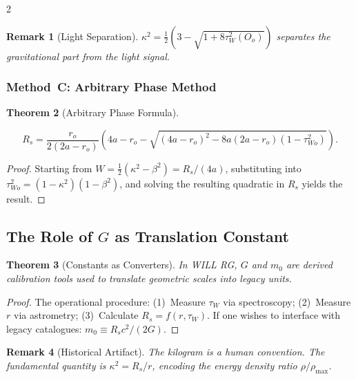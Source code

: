 \documentclass[10pt, a4paper]{article}
\newtheorem{theorem}{Theorem}[section]
\newtheorem{remark}[theorem]{Remark}
\begin{document}
\begin{multicols}{2}
\begin{remark}[Light Separation]
$\kappa^2=\frac{1}{2}(3 - \sqrt{1 + 8\tau_W^2(O_o)})$ separates the gravitational part from the light signal.
\end{remark}

\subsubsection{Method~C: Arbitrary Phase Method}

\begin{theorem}[Arbitrary Phase Formula]
\hypertarget{thm:arbitrary_phase}{}\label{thm:arbitrary_phase}
\hypertarget{eq:Rs_arbitrary}{}\label{eq:Rs_arbitrary}
\begin{equation}
\boxed{R_s = \frac{r_o}{2(2a-r_o)}(4a - r_o - \sqrt{(4a-r_o)^2 - 8a(2a-r_o)(1-\tau_{Wo}^2)}).}
\end{equation}
\end{theorem}

\begin{proof}
Starting from $W = \frac{1}{2}(\kappa^2-\beta^2) = R_s/(4a)$, substituting into $\tau_{Wo}^2 = (1-\kappa^2)(1-\beta^2)$, and solving the resulting quadratic in $R_s$ yields the result.
\end{proof}

\subsection{The Role of $G$ as Translation Constant}

\begin{theorem}[Constants as Converters]
In WILL RG, $G$ and $m_0$ are derived calibration tools used to translate geometric scales into legacy units.
\end{theorem}

\begin{proof}
The operational procedure: (1)~Measure $\tau_W$ via spectroscopy; (2)~Measure $r$ via astrometry; (3)~Calculate $R_s = f(r,\tau_W)$. If one wishes to interface with legacy catalogues: $m_0 \equiv R_s c^2/(2G)$.
\end{proof}

\begin{remark}[Historical Artifact]
The kilogram is a human convention. The fundamental quantity is $\kappa^2 = R_s/r$, encoding the energy density ratio $\rho/\rho_{\max}$.
\end{remark}




\end{multicols}
\end{document}
